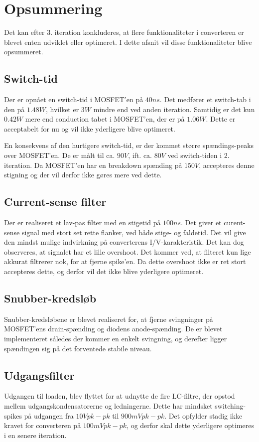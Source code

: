 
\section{Opsummering}
Det kan efter 3. iteration konkluderes, at flere funktionaliteter i converteren er blevet enten udviklet eller optimeret. I dette afsnit vil disse funktionaliteter blive opsummeret. 

\subsection{Switch-tid}
Der er opnået en switch-tid i MOSFET'en på $40ns$. Det medfører et switch-tab i den på $1.48W$, hvilket er $3W$ mindre end ved anden iteration. Samtidig er det kun $0.42W$ mere end conduction tabet i MOSFET'en, der er på $1.06W$. Dette er acceptabelt for nu og vil ikke yderligere blive optimeret. 

En konsekvens af den hurtigere switch-tid, er der kommet større spændings-peaks over MOSFET'en. De er målt til ca. $90V$, ift. ca. $80V$ ved switch-tiden i 2. iteration. Da MOSFET'en har en breakdown spænding på $150V$, accepteres denne stigning og der vil derfor ikke gøres mere ved dette.


\subsection{Current-sense filter}
Der er realiseret et lav-pas filter med en stigetid på $100ns$. Det giver et curent-sense signal med stort set rette flanker, ved både stige- og faldetid. Det vil give den mindst mulige indvirkning på converterens I/V-karakteristik. Det kan dog observeres, at signalet har et lille overshoot. Det kommer ved, at filteret kun lige akkurat filtrerer nok, for at fjerne spike'en. Da dette overshoot ikke er ret stort accepteres dette, og derfor vil det ikke blive yderligere optimeret.


\subsection{Snubber-kredsløb}
Snubber-kredsløbene er blevet realiseret for, at fjerne svingninger på MOSFET'ens drain-spænding og diodens anode-spænding. De er blevet implementeret således der kommer en enkelt svingning, og derefter ligger spændingen sig på det forventede stabile niveau. 


\subsection{Udgangsfilter}
Udgangen til loaden, blev flyttet for at udnytte de fire LC-filtre, der opstod mellem udgangskondensatorerne og ledningerne. Dette har mindsket switching-spikes på udgangen fra $10Vpk-pk$ til $900mVpk-pk$. Det opfylder stadig ikke kravet for converteren på $100mVpk-pk$, og derfor skal dette yderligere optimeres i en senere iteration. 

